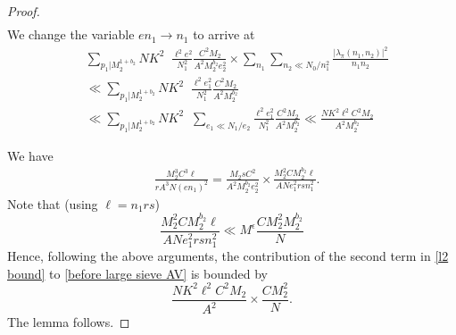 \documentclass[12pt,a4paper,twoside, reqno]{amsart}
\newcommand{\e}[2]{e\left(\frac{#1}{#2}\right)}
\begin{document}
\begin{proof}
\begin{align*}
\end{align*}
We change the variable $en_1 \rightarrow n_1$ to arrive at 
\begin{align*}
      &  \sum_{p_1|M_2^{1+b_2}}NK^2 \mathop{\sum_{\substack {e_1e_2 \ll N_1  \\e_1 \mid M_2^{1+b_2} }   }}       \frac{\ell^2 e^2}{N_1^2} \frac{C^2 M_2}{A^2  M_2^{ b_2} e_2^2 }  \times  \sum_{n_1 }\sum_{n_2 \ll N_0/n_1^2}  \frac{|\lambda_\pi(n_1,n_2)|^2 }{n_1 n_2}\\
      &\ll  \sum_{p_1|M_2^{1+b_2}}NK^2 \mathop{\sum_{\substack {e_1e_2 \ll N_1  \\e_1 \mid M_2^{1+b_2} }   }}      \frac{\ell^2  e_1^2}{N_1^2} \frac{C^2 M_2 }{A^2  M_2^{ b_2}  }  \\
      & \ll \sum_{p_1|M_2^{1+b_2}}NK^2 \mathop{\sum_{\substack {e_2 \ll N_1 }   }}  \sum_{e_1 \ll N_1/e_2}    \frac{\ell^2  e_1^2}{N_1^2} \frac{C^2 M_2}{A^2  M_2^{ b_2}  }  
      \ll  \frac{NK^2 {\ell^2} C^2 M_2}{A^2 M_2^{ b_2}   }
   \end{align*}

We have 
\begin{align*}
   & \frac{M_2^3C^3 \ell}{ r A^3N(en_1)^2}= \frac{M_2sC^2 }{A^2 M_2^{b_2}e_2^2 } \times  \frac{M_2^2 C M_2^{b_2} \ell }{ANe_1^2rsn_1^2 } .
\end{align*}
Note that (using $\ell=n_1rs$)
\[ \frac{M_2^2 C M_2^{b_2} \ell }{ANe_1^2rsn_1^2 }  \ll M^\epsilon \frac{ CM_2^2 M_2^{b_2}}{N} \]
Hence, following the above arguments,  the contribution of  the second  term in \eqref{l2 bound} to \eqref{before large sieve AV} is  bounded by  
$$ \frac{NK^2 {\ell^2} C^2 M_2}{A^2    }   \times \frac{CM_2^2}{N}.$$ The lemma follows. 

\end{proof}


\end{document}
